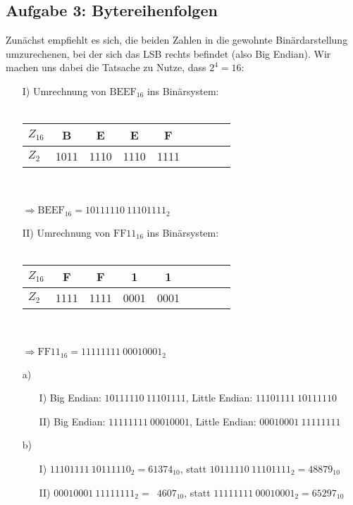 \documentclass{article}
\begin{document}
    \subsection*{Aufgabe 3: Bytereihenfolgen}
    Zunächst empfiehlt es sich, die beiden Zahlen in die gewohnte Binärdarstellung umzurechenen, bei der sich das LSB rechts befindet (also Big Endian). Wir machen uns dabei die Tatsache zu Nutze, dass $2^4 = 16$:
    \begin{enumerate}
        \item[I)] Umrechnung von $\mathrm{BEEF}_{16}$ ins Binärsystem: \\\\
        \begin{tabular}{l|cccccccc} 
            $Z_{16}$ & B    & E    & E    & F \\
            \hline
            $Z_{2}$  & 1011 & 1110 & 1110 & 1111
        \end{tabular}\\\\
        $\Rightarrow \mathrm{BEEF}_{16} = 10111110 \: 11101111_2$
        \item[II)] Umrechnung von $\mathrm{FF11}_{16}$ ins Binärsystem: \\\\
        \begin{tabular}{l|cccccccc} 
            $Z_{16}$ & F    & F    & 1    & 1 \\
            \hline
            $Z_{2}$  & 1111 & 1111 & 0001 & 0001
        \end{tabular}\\\\
        $\Rightarrow \mathrm{FF11}_{16} = 11111111 \: 00010001_2$
    \end{enumerate}

    \begin{enumerate}
        \item[a)]
        \begin{enumerate}
            \item[I)] Big Endian: $10111110 \: 11101111$, Little Endian: $11101111 \: 10111110$
            \item[II)] Big Endian: $11111111 \: 00010001$, Little Endian: $00010001 \: 11111111$
        \end{enumerate}
        \item[b)]
        \begin{enumerate}
            \item[I)] $11101111 \: 10111110_2 = 61374_{10}$, statt $10111110 \: 11101111_2 = 48879_{10}$
            \item[II)] $00010001 \: 11111111_2 = \phantom{0}4607_{10}$, statt $11111111 \: 00010001_2 = 65297_{10}$
        \end{enumerate}
    \end{enumerate}
\end{document}
